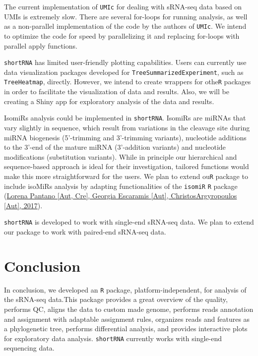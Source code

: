 \documentclass[12pt,twoside]{reedthesis}
\begin{document}
The current implementation of \texttt{UMIc} for dealing with sRNA-seq data based
on UMIs is extremely slow. There are several for-loops for running
analysis, as well as a non-parallel implementation of the code by the
authors of \texttt{UMIc}. We intend to optimize the code for speed by
parallelizing it and replacing for-loops with parallel apply functions.

\texttt{shortRNA} has limited user-friendly plotting capabilities. Users can
currently use data visualization packages developed for
\texttt{TreeSummarizedExperiment}, such as \texttt{TreeHeatmap}, directly. However, we
intend to create wrappers for othe\texttt{R} packages in order to facilitate the
visualization of data and results. Also, we will be creating a Shiny app
for exploratory analysis of the data and results.

IsomiRs analysis could be implemented in \texttt{shortRNA}. IsomiRs are miRNAs
that vary slightly in sequence, which result from variations in the
cleavage site during miRNA biogenesis (5'-trimming and 3'-trimming
variants), nucleotide additions to the 3'-end of the mature miRNA
(3'-addition variants) and nucleotide modifications (substitution
variants). While in principle our hierarchical and sequence-based
approach is ideal for their investigation, tailored functions would make
this more straightforward for the users. We plan to extend ou\texttt{R} package
to include isoMiRs analysis by adapting functionalities of the \texttt{isomiR} \texttt{R}
package
(\protect\hyperlink{ref-lorenapantanoautcregeorgiaescaramisautchristosargyropoulosaut2017}{Lorena Pantano {[}Aut, Cre{]}, Georgia Escaramis {[}Aut{]}, ChristosArgyropoulos {[}Aut{]}, 2017}).

\texttt{shortRNA} is developed to work with single-end sRNA-seq data. We plan to
extend our package to work with paired-end sRNA-seq data.

\hypertarget{conclusion}{%
\section{Conclusion}\label{conclusion}}

In conclusion, we developed an \texttt{R} package, platform-independent, for
analysis of the sRNA-seq data.This package provides a great overview of
the quality, performs QC, aligns the data to custom made genome,
performs reads annotation and assignment with adaptable assignment
rules, organizes reads and features as a phylogenetic tree, performs
differential analysis, and provides interactive plots for exploratory
data analysis. \texttt{shortRNA} currently works with single-end sequencing data.
\end{document}
